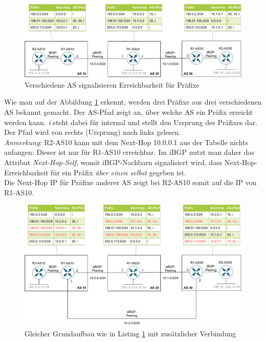 \begin{figure}[h]
  \centering
  \includegraphics[scale=0.75]{Figures/ebgp_peerings.pdf}
  \caption{Verschiedene AS signalisieren Erreichbarkeit für Präfixe}
  \label{grafik: ebgp_peerings}
\end{figure}\FloatBarrier

Wie man auf der Abbildung \ref{grafik: ebgp_peerings} erkennt, werden drei Präfixe aus drei verschiedenen AS bekannt gemacht. Der AS-Pfad zeigt an, über welche AS ein Präfix erreicht werden kann. \textit{i} steht dabei für internal und stellt den Ursprung des Präfixes dar. Der Pfad wird von rechts (Ursprung) nach links gelesen.\cite{odom2010}\\
\textit{Anmerkung}: R2-AS10 kann mit dem Next-Hop 10.0.0.1 aus der Tabelle nichts anfangen: Dieser ist nur für R1-AS10 erreichbar. Im iBGP nutzt man daher das Attribut \textit{Next-Hop-Self}, womit iBGP-Nachbarn signalisiert wird, dass Next-Hop-Erreichbarkeit für ein Präfix \textit{über einen selbst} gegeben ist.\cite[S.468-471]{odom2010}\\
Die Next-Hop IP für Präfixe anderer AS zeigt bei R2-AS10 somit auf die IP von R1-AS10.

\begin{figure}[h]
  \centering
  \includegraphics[scale=0.75]{Figures/ebgp_peerings_additional_connection.pdf}
  \caption{Gleicher Grundaufbau wie in Listing \ref{grafik: ebgp_peerings} mit zusätzlicher Verbindung}
  \label{grafik: ebgp_peerings_additional_connection}
\end{figure}\FloatBarrier

